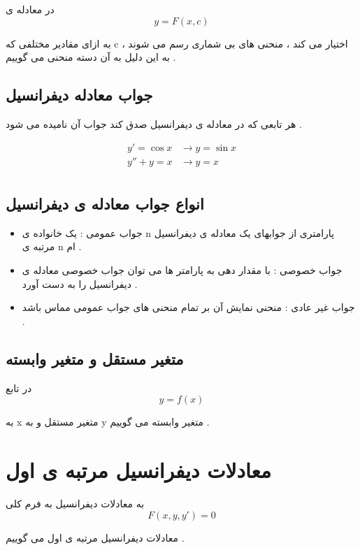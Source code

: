 \documentclass[12pt]{book}
\begin{document}
در معادله ی 
$$
y = F(x,c)
$$

به ازای مقادیر مختلفی که c اختیار می کند ، منحنی های بی شماری رسم می شوند ، به این دلیل به آن دسته منحنی می گوییم .

\newpage
\section{جواب معادله دیفرانسیل}

هر تابعی که در معادله ی دیفرانسیل صدق کند جواب آن نامیده می شود .

\begin{align*}
y' = \cos{x} &\to  y = \sin{x} \\
y'' + y = x &\to y = x \\
\end{align*}


\section{انواع جواب معادله ی دیفرانسیل}


\begin{tcolorbox}
\begin{itemize}
	\item جواب عمومی :
	یک خانواده ی n پارامتری از جوابهای یک معادله ی دیفرانسیل مرتبه ی n ام .
	
	\item جواب خصوصی : 
	با مقدار دهی به پارامتر ها می توان جواب خصوصی معادله ی دیفرانسیل را به دست آورد .
	
	\item جواب غیر عادی :
	منحنی نمایش آن بر تمام منحنی های جواب عمومی مماس باشد .
\end{itemize}
\end{tcolorbox}


\section{متغیر مستقل و متغیر وابسته}

در تابع 
$$
y = f(x)
$$

به x  متغیر مستقل و به y متغیر وابسته می گوییم .

\chapter{معادلات دیفرانسیل مرتبه ی اول}

به معادلات دیفرانسیل به فرم کلی
$$
F(x,y,y') = 0
$$

معادلات دیفرانسیل مرتبه ی اول می گوییم .
\end{document}
